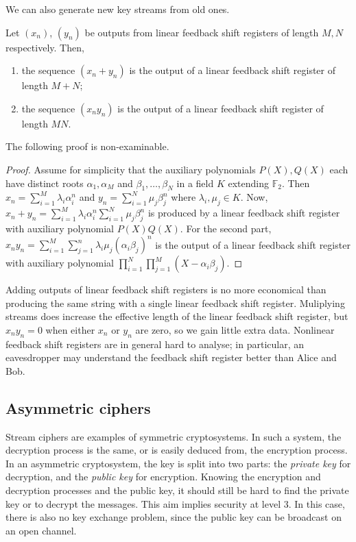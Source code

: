 We can also generate new key streams from old ones.
\begin{lemma}
    Let \( (x_n) \), \( (y_n) \) be outputs from linear feedback shift registers of length \( M, N \) respectively.
    Then,
    \begin{enumerate}
        \item the sequence \( (x_n + y_n) \) is the output of a linear feedback shift register of length \( M + N \);
        \item the sequence \( (x_n y_n) \) is the output of a linear feedback shift register of length \( MN \).
    \end{enumerate}
\end{lemma}
The following proof is non-examinable.
\begin{proof}
    Assume for simplicity that the auxiliary polynomials \( P(X), Q(X) \) each have distinct roots \( \alpha_1, \alpha_M \) and \( \beta_1, \dots, \beta_N \) in a field \( K \) extending \( \mathbb F_2 \).
    Then \( x_n = \sum_{i=1}^M \lambda_i \alpha_i^n \) and \( y_n = \sum_{i=1}^N \mu_j \beta_j^n \) where \( \lambda_i, \mu_j \in K \).
    Now, \( x_n + y_n = \sum_{i=1}^M \lambda_i \alpha_i^n \sum_{i=1}^N \mu_j \beta_j^n \) is produced by a linear feedback shift register with auxiliary polynomial \( P(X) Q(X) \).
    For the second part, \( x_n y_n = \sum_{i=1}^M \sum_{j=1}^n \lambda_i \mu_j (\alpha_i \beta_j)^n \) is the output of a linear feedback shift register with auxiliary polynomial \( \prod_{i=1}^N \prod_{j=1}^M (X - \alpha_i \beta_j) \).
\end{proof}
Adding outputs of linear feedback shift registers is no more economical than producing the same string with a single linear feedback shift register.
Muliplying streams does increase the effective length of the linear feedback shift register, but \( x_n y_n = 0 \) when either \( x_n \) or \( y_n \) are zero, so we gain little extra data.
Nonlinear feedback shift registers are in general hard to analyse; in particular, an eavesdropper may understand the feedback shift register better than Alice and Bob.

\subsection{Asymmetric ciphers}
Stream ciphers are examples of symmetric cryptosystems.
In such a system, the decryption process is the same, or is easily deduced from, the encryption process.
In an asymmetric cryptosystem, the key is split into two parts: the \emph{private key} for decryption, and the \emph{public key} for encryption.
Knowing the encryption and decryption processes and the public key, it should still be hard to find the private key or to decrypt the messages.
This aim implies security at level 3.
In this case, there is also no key exchange problem, since the public key can be broadcast on an open channel.

